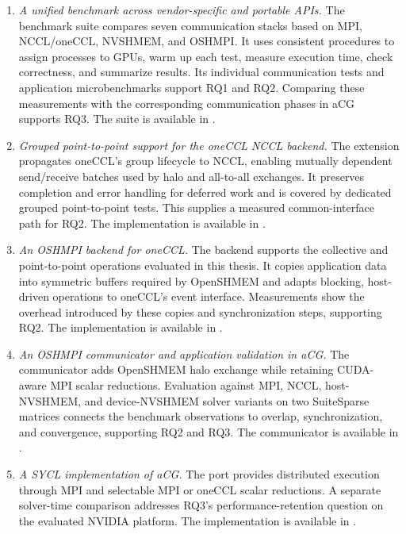 \begin{enumerate}

\item \emph{A unified benchmark across vendor-specific and portable \acp{API}.}
The benchmark suite compares seven communication stacks based on MPI, NCCL/oneCCL, NVSHMEM, and OSHMPI. It uses consistent procedures to assign processes to GPUs, warm up each test, measure execution time, check correctness, and summarize results. Its individual communication tests and application microbenchmarks support RQ1 and RQ2. Comparing these measurements with the corresponding communication phases in aCG supports RQ3. The suite is available in \cite{merenda_gpu_comm_benchmark_2026}.

\item \emph{Grouped point-to-point support for the oneCCL NCCL backend.}
The extension propagates oneCCL's group lifecycle to NCCL, enabling mutually dependent send/receive batches used by halo and all-to-all exchanges. It preserves completion and error handling for deferred work and is covered by dedicated grouped point-to-point tests. This supplies a measured common-interface path for RQ2. The implementation is available in \cite{merenda_oneccl_nccl_groups_2026}.

\item \emph{An OSHMPI backend for oneCCL.}
The backend supports the collective and point-to-point operations evaluated in this thesis. It copies application data into symmetric buffers required by OpenSHMEM and adapts blocking, host-driven operations to oneCCL's event interface. Measurements show the overhead introduced by these copies and synchronization steps, supporting RQ2. The implementation is available in \cite{merenda_oneccl_oshmpi_2026}.

\item \emph{An OSHMPI communicator and application validation in aCG.}
The communicator adds OpenSHMEM halo exchange while retaining CUDA-aware MPI scalar reductions. Evaluation against MPI, NCCL, host-NVSHMEM, and device-NVSHMEM solver variants on two SuiteSparse matrices connects the benchmark observations to overlap, synchronization, and convergence, supporting RQ2 and RQ3. The communicator is available in \cite{merenda_acg_oshmpi_2026}.

\item \emph{A SYCL implementation of aCG.}
The port provides distributed execution through MPI and selectable MPI or oneCCL scalar reductions. A separate solver-time comparison addresses RQ3's performance-retention question on the evaluated NVIDIA platform. The implementation is available in \cite{merenda_acg_sycl_2026}.

\end{enumerate}

